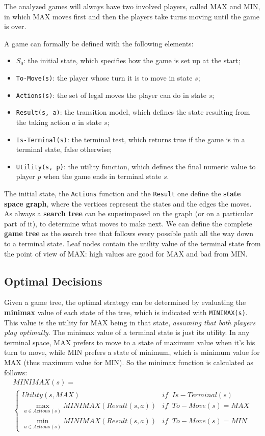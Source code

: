 \documentclass{article}
\begin{document}
The analyzed games will always have two involved players, called MAX and MIN, in which MAX moves first and then the players take turns moving until the game is over. 

A game can formally be defined with the following elements:
\begin{itemize}
    \item $S_0$: the initial state, which specifies how the game is set up at the start;
    \item \lstinline{To-Move(s)}: the player whose turn it is to move in state $s$;
    \item \lstinline{Actions(s)}: the set of legal moves the player can do in state $s$;
    \item \lstinline{Result(s, a)}: the transition model, which defines the state resulting from the taking action $a$ in state $s$;
    \item \lstinline{Is-Terminal(s)}: the terminal test, which returns true if the game is in a terminal state, false otherwise;
    \item \lstinline{Utility(s, p)}: the utility function, which defines the final numeric value to player $p$ when the game ends in terminal state $s$.    
\end{itemize}

The initial state, the \lstinline{Actions} function and the \lstinline{Result} one define the \textbf{state space graph}, where the vertices represent the states and the edges the moves. As always a \textbf{search tree} can be superimposed on the graph (or on a particular part of it), to determine what moves to make next. We can define the complete \textbf{game tree} as the search tree that follows every possible path all the way down to a terminal state.
Leaf nodes contain the utility value of the terminal state from the point of view of MAX: high values are good for MAX and bad from MIN.

\subsection{Optimal Decisions}
Given a game tree, the optimal strategy can be determined by evaluating the \textbf{minimax} value of each state of the tree, which is indicated with \lstinline{MINIMAX(s)}. This value is the utility for MAX being in that state, \textit{assuming that both players play optimally}. The minimax value of a terminal state is just its utility. In any terminal space, MAX prefers to move to a state of maximum value when it's his turn to move, while MIN prefers a state of minimum, which is minimum value for MAX (thus maximum value for MIN). So the minimax function is calculated as follows:
\begin{multline}
    MINIMAX(s) = \\
    \begin{cases}
        Utility(s, MAX) & if \;\; Is-Terminal(s) \\
        \max_{a\in Actions(s)} MINIMAX(Result(s, a)) & if \;\; To-Move(s) = MAX \\
        \min_{a \in Actions(s)} MINIMAX(Result(s, a)) & if \;\; To-Move(s) = MIN        
    \end{cases}
\end{multline}
\end{document}
